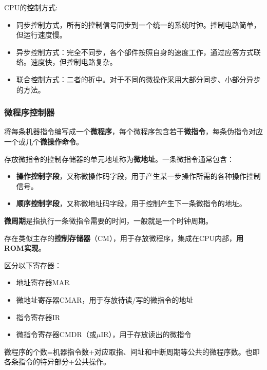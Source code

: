 \documentclass[12pt, a4paper, oneside]{ctexart}
\begin{document}
CPU的控制方式:
\begin{itemize}
  \item 同步控制方式，所有的控制信号同步到一个统一的系统时钟。控制电路简单，但运行速度慢。
  \item 异步控制方式：完全不同步，各个部件按照自身的速度工作，通过应答方式联络。速度快，但控制电路复杂。
  \item 联合控制方式：二者的折中。对于不同的微操作采用大部分同步、小部分异步的方法。
\end{itemize}

\subsubsection{微程序控制器}

将每条机器指令编写成一个\textbf{微程序}，每个微程序包含若干\textbf{微指令}，每条伪指令对应一个或几个\textbf{微操作命令}。

存放微指令的控制存储器的单元地址称为\textbf{微地址}。一条微指令通常包含：
\begin{itemize}
  \item {\bf 操作控制字段}，又称微操作码字段，用于产生某一步操作所需的各种操作控制信号。
  \item {\bf 顺序控制字段}，又称微地址码字段，用于控制产生下一条微指令的地址。
\end{itemize}

\textbf{微周期}是指执行一条微指令需要的时间，一般就是一个时钟周期。

存在类似主存的\textbf{控制存储器}（CM），用于存放微程序，集成在CPU内部，\textbf{用ROM实现}。

区分以下寄存器：
\begin{itemize}
  \item 地址寄存器MAR
  \item 微地址寄存器CMAR，用于存放待读/写的微指令的地址
  \item 指令寄存器IR
  \item 微指令寄存器CMDR（或$\mu$IR），用于存放读出的微指令
\end{itemize}

微程序的个数=机器指令数+对应取指、间址和中断周期等公共的微程序数。也即各条指令的特异部分+公共操作。
\end{document}
